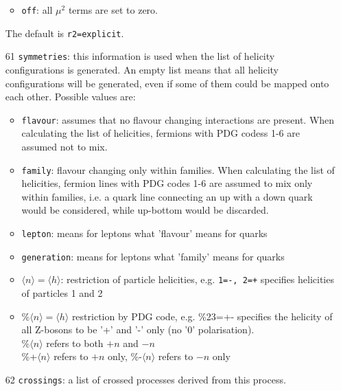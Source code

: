 \documentclass[11pt,a4paper]{refrep}
\begin{document}
\begin{enumerate}
\begin{itemize}
\item {\tt off}: all $\mu^2$ terms are set to zero.
\end{itemize}
 The default is {\tt r2=explicit}.
\item[61] \texttt{symmetries}: this information is used when the list of helicity configurations is generated. 
An empty list means that all helicity configurations will be generated, even if some of them could be 
mapped onto each other.
Possible values are:  
\begin{itemize}
\item {\tt flavour}:  assumes that no flavour changing interactions are present.             
When calculating the list of helicities, fermions
with PDG codess 1-6 are assumed not to mix.                         
\item {\tt family}:  flavour changing only within families.           
             When calculating the list of helicities, fermion lines
        with PDG codes 1-6 are assumed to mix only within families,        
        i.e. a quark line connecting an up with a down quark would   
        be considered, while up-bottom would be discarded.                      
\item  {\tt lepton}:   means for leptons what 'flavour' means for quarks
\item  {\tt generation}: means for leptons what 'family' means for quarks
\item $\langle n\rangle =\langle h\rangle $:    restriction of particle helicities,             
             e.g. {\tt 1=-, 2=+} specifies helicities of particles 1 and 2
\item \%$\langle n\rangle =\langle h\rangle $   restriction by PDG code,                        
 e.g. \%23=+- specifies the helicity of all Z-bosons to be '+' and '-' only (no '0' polarisation).  \\              
             \%$\langle n\rangle $ refers to both $+n$ and $-n$    \\                      
             \%+$\langle n\rangle $ refers to $+n$ only,                                 
             \%-$\langle n\rangle $ refers to $-n$ only  
\end{itemize}	                                   
\item[62] \texttt{crossings}:  a list of crossed processes derived from this process.          

\end{enumerate}
\end{document}

